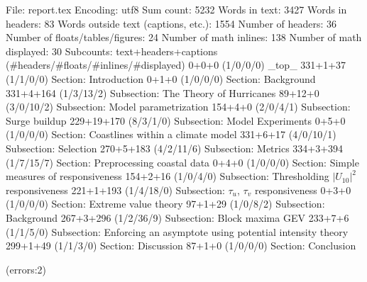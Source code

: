 
File: report.tex
Encoding: utf8
Sum count: 5232
Words in text: 3427
Words in headers: 83
Words outside text (captions, etc.): 1554
Number of headers: 36
Number of floats/tables/figures: 24
Number of math inlines: 138
Number of math displayed: 30
Subcounts:
  text+headers+captions (#headers/#floats/#inlines/#displayed)
  0+0+0 (1/0/0/0) _top_
  331+1+37 (1/1/0/0) Section: Introduction
  0+1+0 (1/0/0/0) Section: Background
  331+4+164 (1/3/13/2) Subsection: The Theory of Hurricanes
  89+12+0 (3/0/10/2) Subsection: Model parametrization
  154+4+0 (2/0/4/1) Subsection: Surge buildup
  229+19+170 (8/3/1/0) Subsection: Model Experiments
  0+5+0 (1/0/0/0) Section: Coastlines within a climate model
  331+6+17 (4/0/10/1) Subsection: Selection
  270+5+183 (4/2/11/6) Subsection: Metrics
  334+3+394 (1/7/15/7) Section: Preprocessing coastal data
  0+4+0 (1/0/0/0) Section: Simple measures of responsiveness
  154+2+16 (1/0/4/0) Subsection: Thresholding $|U_{10}|^2$ responsiveness
  221+1+193 (1/4/18/0) Subsection: $\tau_u$, $\tau_v$ responsiveness
  0+3+0 (1/0/0/0) Section: Extreme value theory
  97+1+29 (1/0/8/2) Subsection: Background
  267+3+296 (1/2/36/9) Subsection: Block maxima GEV
  233+7+6 (1/1/5/0) Subsection: Enforcing an asymptote using potential intensity theory 
  299+1+49 (1/1/3/0) Section: Discussion
  87+1+0 (1/0/0/0) Section: Conclusion

(errors:2)
